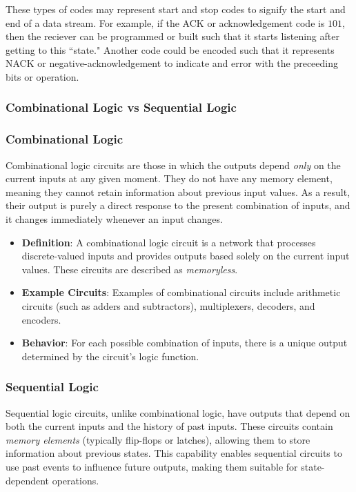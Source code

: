 \documentclass[12pt]{article}
\begin{document}
These types of codes may represent start and stop codes to signify the start and
end of a data stream. For example, if the ACK or acknowledgement code is
\(101\), then the reciever can be programmed or built such that it starts
listening after getting to this ``state." Another code could be encoded such
that it represents NACK or negative-acknowledgement to indicate and error with
the preceeding bits or operation.

\subsubsection*{Combinational Logic vs Sequential Logic}
\hline
\vspace{5mm}
\subsubsection*{Combinational Logic}
Combinational logic circuits are those in which the outputs depend \textit{only} on the current inputs at any given moment. They do not have any memory element, meaning they cannot retain information about previous input values. As a result, their output is purely a direct response to the present combination of inputs, and it changes immediately whenever an input changes.

\begin{itemize}
	\item \textbf{Definition}: A combinational logic circuit is a network that processes discrete-valued inputs and provides outputs based solely on the current input values. These circuits are described as \textit{memoryless}.
	\item \textbf{Example Circuits}: Examples of combinational circuits include arithmetic circuits (such as adders and subtractors), multiplexers, decoders, and encoders.
	\item \textbf{Behavior}: For each possible combination of inputs, there is a unique output determined by the circuit’s logic function.
\end{itemize}

\hline

\subsubsection*{Sequential Logic}
Sequential logic circuits, unlike combinational logic, have outputs that depend on both the current inputs and the history of past inputs. These circuits contain \textit{memory elements} (typically flip-flops or latches), allowing them to store information about previous states. This capability enables sequential circuits to use past events to influence future outputs, making them suitable for state-dependent operations.
\end{document}
